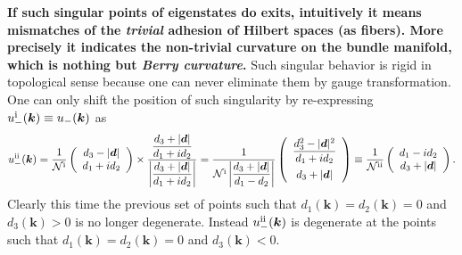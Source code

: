 \documentclass[10pt,nofootinbib]{revtex4}
\newcommand{\RN}[1]{%
  \textup{\uppercase\expandafter{\romannumeral#1}}%
}
\begin{document}
		\textbf{If such singular points of eigenstates do exits, intuitively it means mismatches of the \emph{trivial} adhesion of Hilbert spaces (as fibers). More precisely it indicates the non-trivial curvature on the bundle manifold, which is nothing but \emph{Berry curvature}.} Such singular behavior is rigid in topological sense because one can never eliminate them by gauge transformation. One can only shift the position of such singularity by re-expressing $u_-^{\RN{1}}(\bm{k})\equiv u_-(\bm{k})$ as
		\begin{equation}\label{1.1.4}
			u^{\RN{2}}_-(\bm{k})=\dfrac{1}{\mathcal{N}^{\RN{1}}}\left(\begin{array}{c}
				d_3-|\bm{d}|\\d_1+id_2
			\end{array}\right)\times\dfrac{\dfrac{d_3+|\bm{d}|}{d_1+id_2}}{\left|\dfrac{d_3+|\bm{d}|}{d_1+id_2}\right|}=\dfrac{1}{\mathcal{N}^{\RN{1}}\left|\dfrac{d_3+|\bm{d}|}{d_1-d_2}\right|}\left(\begin{array}{c}
				\dfrac{d_3^2-|\bm{d}|^2}{d_1+id_2}\\[1em]
				d_3+|\bm{d}|
			\end{array}\right)\equiv\dfrac{1}{\mathcal{N}^{\RN{2}}}\left(\begin{array}{c}
				d_1-id_2\\d_3+|\bm{d}|
			\end{array}\right).
		\end{equation}
		Clearly this time the previous set of points such that $d_1(\bm{k})=d_2(\bm{k})=0$ and $d_3(\bm{k})>0$ is no longer degenerate. Instead $u_-^{\RN{2}}(\bm{k})$ is degenerate at the points such that $d_1(\bm{k})=d_2(\bm{k})=0$ and $d_3(\bm{k})<0$.\par
\end{document}
